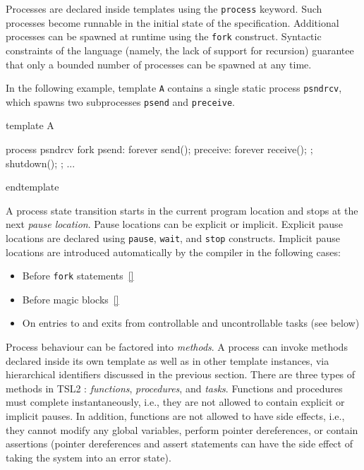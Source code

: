 \documentclass{report}
\newcommand{\src}[1]{\texttt{#1}}
\newcommand{\tsl}{TSL2 }
\begin{document}
Processes are declared inside templates using the \src{process} 
keyword.  Such processes become runnable in the initial state of 
the specification.  Additional processes can be spawned at runtime 
using the \src{fork} construct.  Syntactic constraints of the 
language (namely, the lack of support for recursion) guarantee 
that only a bounded number of processes can be spawned at any 
time.  

In the following example, template \src{A} contains a single 
static process \src{psndrcv}, which spawns two subprocesses 
\src{psend} and \src{preceive}.
\begin{tsllisting}{}
template A

process psndrcv {
  fork {
    psend:    forever send();
    preceive: forever receive();
  };
  shutdown();
};
...

endtemplate
\end{tsllisting}


A process state transition starts in the current program location 
and stops at the next \emph{pause location}.  Pause locations can 
be explicit or implicit.  Explicit pause locations are declared 
using \src{pause}, \src{wait}, and \src{stop} constructs.  
Implicit pause locations are introduced automatically by the 
compiler in the following cases:

\begin{itemize}
    \item Before \src{fork} statements~\ref{}
    \item Before magic blocks~\ref{}
    \item On entries to and exits from controllable and 
        uncontrollable tasks (see below)
\end{itemize}

Process behaviour can be factored into \emph{methods}.  A process 
can invoke methods declared inside its own template as well as in 
other template instances, via hierarchical identifiers discussed 
in the previous section.  There are three types of methods in 
\tsl: \emph{functions}, \emph{procedures}, and \emph{tasks}.  
Functions and procedures must complete instantaneously, i.e., they 
are not allowed to contain explicit or implicit pauses.  In 
addition, functions are not allowed to have side effects, i.e., 
they cannot modify any global variables, perform pointer 
dereferences, or contain assertions (pointer dereferences and 
assert statements can have the side effect of taking the system 
into an error state).  
\end{document}
